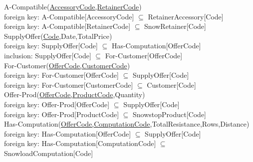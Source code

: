 \documentclass{article}[h]
\begin{document}
{{\color{ForestGreen}A-Compatible(\underline{AccessoryCode,RetainerCode})}\\
{\color{Orange}\hspace{2mm} foreign key: {\color{Magenta}A-Compatible[AccessoryCode] $\subseteq$ RetainerAccessory[Code]}} \\
{\color{Orange}\hspace{2mm} foreign key: {\color{Magenta}A-Compatible[RetainerCode] $\subseteq$ SnowRetainer[Code]}} \\

{\color{ForestGreen}SupplyOffer(\underline{Code},Date,TotalPrice)}\\
{\color{Orange}\hspace{2mm} foreign key: {\color{Magenta}SupplyOffer[Code] $\subseteq$ Has-Computation[OfferCode]}} \\
{\color{Orange}\hspace{2mm} inclusion: {\color{Magenta}SupplyOffer[Code] $\subseteq$ For-Customer[OfferCode]}} \\

{\color{ForestGreen}For-Customer(\underline{OfferCode,CustomerCode})}\\
{\color{Orange}\hspace{2mm} foreign key: {\color{Magenta}For-Customer[OfferCode] $\subseteq$ SupplyOffer[Code]}} \\
{\color{Orange}\hspace{2mm} foreign key: {\color{Magenta}For-Customer[CustomerCode] $\subseteq$ Customer[Code]}} \\

{\color{ForestGreen}Offer-Prod(\underline{OfferCode,ProductCode},Quantity)}\\
{\color{Orange}\hspace{2mm} foreign key: {\color{Magenta}Offer-Prod[OfferCode] $\subseteq$ SupplyOffer[Code]}} \\
{\color{Orange}\hspace{2mm} foreign key: {\color{Magenta}Offer-Prod[ProductCode] $\subseteq$ SnowstopProduct[Code]}} \\

{\color{ForestGreen}Has-Computation(\underline{OfferCode,ComputationCode},TotalResistance,Rows,Distance)}\\
{\color{Orange}\hspace{2mm} foreign key: {\color{Magenta}Has-Computation[OfferCode] $\subseteq$ SupplyOffer[Code]}} \\
{\color{Orange}\hspace{2mm} foreign key: {\color{Magenta}Has-Computation[ComputationCode] $\subseteq$ SnowloadComputation[Code]}} \\

}
\end{document}
